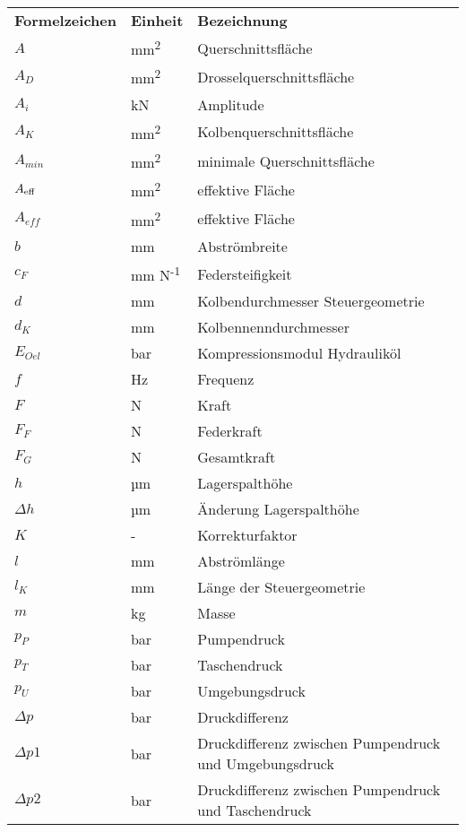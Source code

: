 \pagestyle{scrheadings}
\begin{tabular}{p{40mm} p{30mm} p{73mm}}
\bfseries Formelzeichen & \bfseries Einheit & \bfseries Bezeichnung\\
$A$&mm\textsuperscript{2}&Querschnittsfläche\\
$A_{D}$&mm\textsuperscript{2}&Drosselquerschnittsfläche\\
$A_{i}$&kN&Amplitude\\
$A_{K}$&mm\textsuperscript{2}&Kolbenquerschnittsfläche\\
$A_{min}$&mm\textsuperscript{2}&minimale Querschnittsfläche\\
$A\textsubscript{eff}$&mm\textsuperscript{2}&effektive Fläche\\
$A_{eff}$&mm\textsuperscript{2}&effektive Fläche\\
$b$&mm&Abströmbreite\\
$c_F$&mm N\textsuperscript{-1}&Federsteifigkeit\\
$d$&mm&Kolbendurchmesser Steuergeometrie\\
$d_K$&mm&Kolbennenndurchmesser\\
$E_{Oel}$&bar&Kompressionsmodul Hydrauliköl\\
$f$&Hz&Frequenz\\
$F$&N&Kraft\\
$F_{F}$&N&Federkraft\\
$F_{G}$&N&Gesamtkraft\\
$h$&µm&Lagerspalthöhe\\
$\Delta{h}$&µm&Änderung Lagerspalthöhe\\
$K$&-&Korrekturfaktor\\
$l$&mm&Abströmlänge\\
$l_K$&mm&Länge der Steuergeometrie\\
$m$&kg&Masse\\
$p_{P}$&bar&Pumpendruck\\
$p_{T}$&bar&Taschendruck\\
$p_{U}$&bar&Umgebungsdruck\\
$\Delta{p}$&bar&Druckdifferenz\\
$\Delta{p1}$&bar&Druckdifferenz zwischen Pumpendruck und Umgebungsdruck\\
$\Delta{p2}$&bar&Druckdifferenz zwischen Pumpendruck und Taschendruck\\

\end{tabular}
